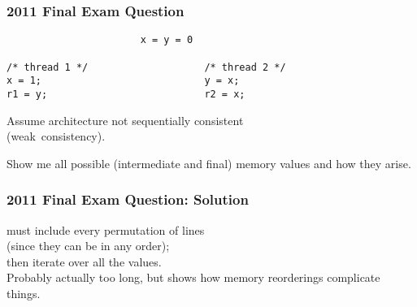 \begin{frame}[fragile]
  \frametitle{2011 Final Exam Question}

  
  \begin{lstlisting}
                       x = y = 0

/* thread 1 */                    /* thread 2 */
x = 1;                            y = x;
r1 = y;                           r2 = x;
  \end{lstlisting}

  Assume architecture not sequentially consistent\\ \hspace*{3em} (weak~consistency).

  Show me all possible (intermediate and final) memory values and how they arise.
  
\end{frame}

\begin{frame}[fragile]
  \frametitle{2011 Final Exam Question: Solution}

  
    must include every permutation of lines \\ \qquad (since they can be in
      any order);\\
    then iterate over all the values.\\[1em]

    Probably actually too long, but shows how memory reorderings
      complicate things.
  
\end{frame}

